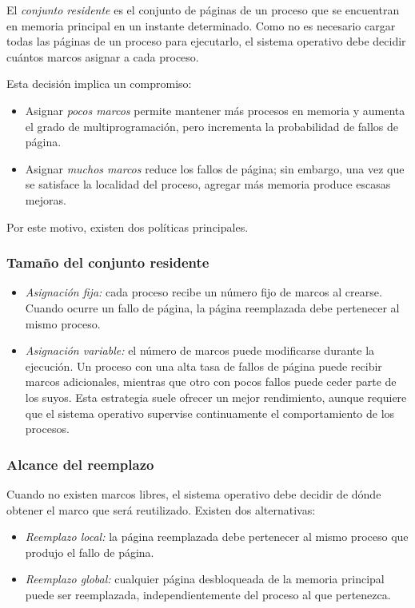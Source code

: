 El \textit{conjunto residente} es el conjunto de páginas de un proceso que se encuentran en memoria principal en un instante determinado. Como no es necesario cargar todas las páginas de un proceso para ejecutarlo, el sistema operativo debe decidir cuántos marcos asignar a cada proceso.

Esta decisión implica un compromiso:
\begin{itemize}
  \item Asignar \textit{pocos marcos} permite mantener más procesos en memoria y aumenta el grado de multiprogramación, pero incrementa la probabilidad de fallos de página.
  \item Asignar \textit{muchos marcos} reduce los fallos de página; sin embargo, una vez que se satisface la localidad del proceso, agregar más memoria produce escasas mejoras.
\end{itemize}
Por este motivo, existen dos políticas principales.

\subsubsection{Tamaño del conjunto residente}

\begin{itemize}
  \item \textit{Asignación fija:} cada proceso recibe un número fijo de marcos al crearse. Cuando ocurre un fallo de página, la página reemplazada debe pertenecer al mismo proceso.
  \item \textit{Asignación variable:} el número de marcos puede modificarse durante la ejecución. Un proceso con una alta tasa de fallos de página puede recibir marcos adicionales, mientras que otro con pocos fallos puede ceder parte de los suyos. Esta estrategia suele ofrecer un mejor rendimiento, aunque requiere que el sistema operativo supervise continuamente el comportamiento de los procesos.
\end{itemize}

\subsubsection{Alcance del reemplazo}

Cuando no existen marcos libres, el sistema operativo debe decidir de dónde obtener el marco que será reutilizado. Existen dos alternativas:
\begin{itemize}
  \item \textit{Reemplazo local:} la página reemplazada debe pertenecer al mismo proceso que produjo el fallo de página.
  \item \textit{Reemplazo global:} cualquier página desbloqueada de la memoria principal puede ser reemplazada, independientemente del proceso al que pertenezca.
\end{itemize}

